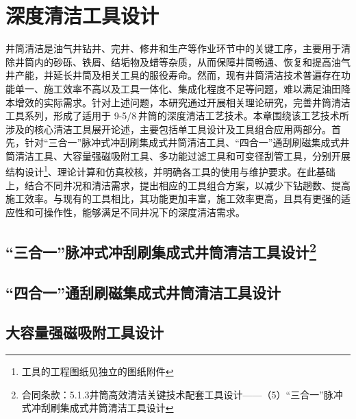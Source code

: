 \documentclass[12pt, a4paper, zihao=-4, openright]{ctexrep}
\newcommand{\inch}{\,\text{''}} %
\begin{document}
\chapter{深度清洁工具设计}

井筒清洁是油气井钻井、完井、修井和生产等作业环节中的关键工序，主要用于清除井筒内的砂砾、铁屑、结垢物及蜡等杂质，从而保障井筒畅通、恢复和提高油气井产能，并延长井筒及相关工具的服役寿命。然而，现有井筒清洁技术普遍存在功能单一、施工效率不高以及工具一体化、集成化程度不足等问题，难以满足油田降本增效的实际需求。针对上述问题，本研究通过开展相关理论研究，完善井筒清洁工具系列，形成了适用于 9-5/8\inch 井筒的深度清洁工艺技术。本章围绕该工艺技术所涉及的核心清洁工具展开论述，主要包括单工具设计及工具组合应用两部分。首先，针对“三合一”脉冲式冲刮刷集成式井筒清洁工具、“四合一”通刮刷磁集成式井筒清洁工具、大容量强磁吸附工具、多功能过滤工具和可变径刮管工具，分别开展结构设计\footnote{工具的工程图纸见独立的图纸附件}、理论计算和仿真校核，并明确各工具的使用与维护要求。在此基础上，结合不同井况和清洁需求，提出相应的工具组合方案，以减少下钻趟数、提高施工效率。与现有的工具相比，其功能更加丰富，施工效率更高，且具有更强的适应性和可操作性，能够满足不同井况下的深度清洁需求。

\section[“三合一”脉冲式冲刮刷集成式井筒清洁工具设计]{“三合一”脉冲式冲刮刷集成式井筒清洁工具设计\protect\footnote{合同条款：5.1.3井筒高效清洁关键技术配套工具设计——（5）“三合一”脉冲式冲刮刷集成式井筒清洁工具设计}}\label{sec:design_of_3_in_1}\label{sanheyi}
\section{“四合一”通刮刷磁集成式井筒清洁工具设计}\label{siheyi}
	
\section{大容量强磁吸附工具设计}
\end{document}
